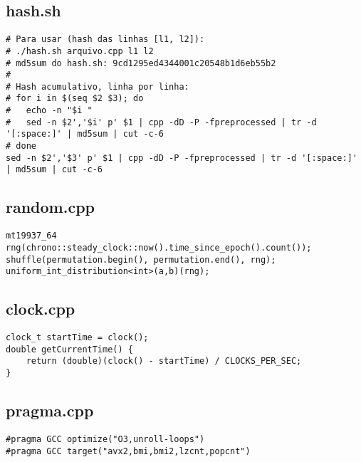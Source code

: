 \documentclass[11pt, a4paper, twoside]{article}
\begin{document}
\subsection{hash.sh}
\begin{lstlisting}
# Para usar (hash das linhas [l1, l2]):
# ./hash.sh arquivo.cpp l1 l2
# md5sum do hash.sh: 9cd1295ed4344001c20548b1d6eb55b2
#
# Hash acumulativo, linha por linha:
# for i in $(seq $2 $3); do
#   echo -n "$i "
#   sed -n $2','$i' p' $1 | cpp -dD -P -fpreprocessed | tr -d '[:space:]' | md5sum | cut -c-6
# done
sed -n $2','$3' p' $1 | cpp -dD -P -fpreprocessed | tr -d '[:space:]' | md5sum | cut -c-6
\end{lstlisting}

\subsection{random.cpp}
\begin{lstlisting}
mt19937_64 rng(chrono::steady_clock::now().time_since_epoch().count());
shuffle(permutation.begin(), permutation.end(), rng);
uniform_int_distribution<int>(a,b)(rng);
\end{lstlisting}

\subsection{clock.cpp}
\begin{lstlisting}
clock_t startTime = clock();
double getCurrentTime() {
	return (double)(clock() - startTime) / CLOCKS_PER_SEC;
}
\end{lstlisting}

\subsection{pragma.cpp}
\begin{lstlisting}
#pragma GCC optimize("O3,unroll-loops")
#pragma GCC target("avx2,bmi,bmi2,lzcnt,popcnt")
\end{lstlisting}
\end{document}
